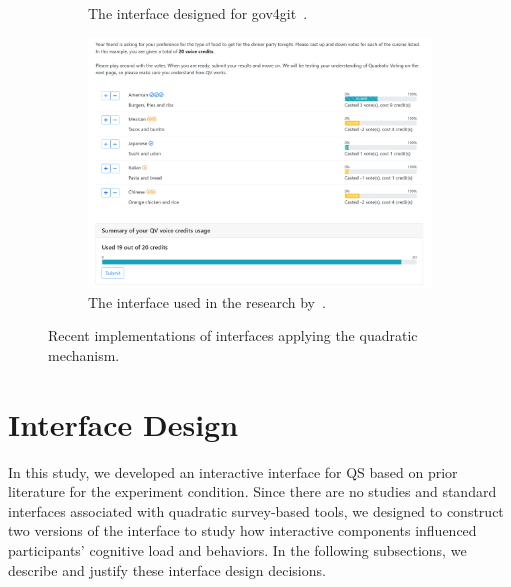 \begin{figure}[ht]
\begin{subfigure}[b]{0.3\textwidth}
        \caption{The interface designed for gov4git~\cite{Gov4gitDecentralizedPlatform2023}.}
        \label{fig:gov4gitInterface}
    \end{subfigure}
    \begin{subfigure}[b]{0.3\textwidth}
        \centering
        \includegraphics[width=\textwidth]{content/image/curr_interface/cheng_qv.png}
        \caption{The interface used in the research by~\textcite{chengCanShowWhat2021}.}
        \label{fig:chengInterface}
    \end{subfigure}
    \caption{Recent implementations of interfaces applying the quadratic mechanism.}
    \label{fig:qv_interface_external}
\end{figure}

\section{Interface Design}
\label{sec:interfaceDesign}
In this study, we developed an interactive interface for QS based on prior literature for the experiment condition. Since there are no studies and standard interfaces associated with quadratic survey-based tools, we designed to construct two versions of the interface to study how interactive components influenced participants' cognitive load and behaviors. In the following subsections, we describe and justify these interface design decisions.

